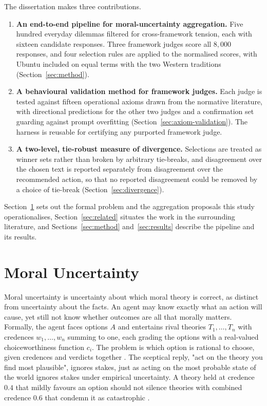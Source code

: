 \documentclass[10pt,twocolumn,a4paper]{article}
\begin{document}
The dissertation makes three contributions.
\begin{enumerate}[leftmargin=*, itemsep=2pt, topsep=2pt]
  \item \textbf{An end-to-end pipeline for moral-uncertainty aggregation.}
  Five hundred everyday dilemmas filtered for cross-framework tension, each
  with sixteen candidate responses. Three framework judges score all
  $8{,}000$ responses, and four selection rules are applied to the
  normalised scores, with Ubuntu included on equal terms with the two
  Western traditions (Section~\ref{sec:method}).
  \item \textbf{A behavioural validation method for framework judges.} Each
  judge is tested against fifteen operational axioms drawn from the
  normative literature, with directional predictions for the other two
  judges and a confirmation set guarding against prompt overfitting
  (Section~\ref{sec:axiom-validation}). The harness is reusable for
  certifying any purported framework judge.
  \item \textbf{A two-level, tie-robust measure of divergence.} Selections
  are treated as winner sets rather than broken by arbitrary tie-breaks,
  and disagreement over the chosen text is reported separately from
  disagreement over the recommended action, so that no reported
  disagreement could be removed by a choice of tie-break
  (Section~\ref{sec:divergence}).
\end{enumerate}

Section~\ref{sec:background} sets out the formal problem and the
aggregation proposals this study operationalises,
Section~\ref{sec:related} situates the work in the surrounding literature,
and Sections~\ref{sec:method} and~\ref{sec:results} describe the pipeline
and its results.

\section{Moral Uncertainty}
\label{sec:background}

Moral uncertainty is uncertainty about which moral theory is correct, as
distinct from uncertainty about the facts. An agent may know exactly what an
action will cause, yet still not know whether outcomes are all that morally
matters. Formally, the agent faces options $A$ and entertains rival theories
$T_1, \dots, T_n$ with credences $w_1, \dots, w_n$ summing to one, each
grading the options with a real-valued choiceworthiness function $c_i$. The
problem is which option is rational to choose, given credences and
verdicts together \cite{macaskill2020}. The sceptical reply, "act on the
theory you find most plausible", ignores stakes, just as acting on the
most probable state of the world ignores stakes under empirical
uncertainty. A theory held at credence $0.4$ that mildly favours an
option should not silence theories with combined credence $0.6$ that
condemn it as catastrophic \cite{macaskill2020}.
\end{document}
